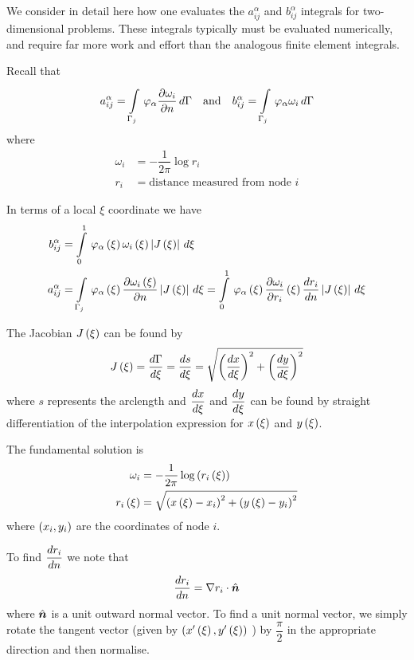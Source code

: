 We consider in detail here how one evaluates the $a_{ij}^{\alpha}$ and
$b_{ij}^{\alpha}$ integrals for two-dimensional problems.  These integrals
typically must be evaluated numerically, and require far more work and effort
than the analogous finite element integrals.

Recall that 
\begin{equation*}
  a_{ij}^{\alpha} =   \displaystyle\int\limits_{\Gamma_{j}}^{} \, \varphi_{\alpha} 
     \dfrac{\partial \omega_i}{\partial n} \,d\Gamma  \quad \text{and} \quad b_{ij}^{\alpha} = 
    \displaystyle\int\limits_{\Gamma_{j}}^{} \, \varphi_{\alpha}  \omega_{i}\,d\Gamma 
\end{equation*}
where 
\begin{align*}
  \omega_{i} &= - \dfrac{1}{2 \pi} \log r_{i}\\
  r_{i} &= \text{distance measured from node $i$}
\end{align*} 

In terms of a local $\xi$ coordinate we have
\begin{align}
  b_{ij}^{\alpha} &=   \displaystyle\int\limits_{0}^{1} \,   \varphi_{\alpha} \left( \xi \right)    \omega_{i}\left( \xi \right) 
    \left|  J\left( \xi \right)  \right|\,d\xi  \\
  a_{ij}^{\alpha} &=   \displaystyle\int\limits_{\Gamma_{j}}^{} \,   \varphi_{\alpha} \left( \xi \right)   
   \dfrac{\partial  \omega_{i}\left( \xi \right) }{\partial n}  \left|  J\left( \xi \right)  \right|\,d\xi  =   \displaystyle\int\limits_{0}^{1} \,   \varphi_{\alpha} \left( \xi \right)     \dfrac{\partial \omega_{i}}{\partial r_{i}} \left( \xi \right)    \dfrac{ d r_{i}}{d n} 
    \left|  J\left( \xi \right)  \right|\,d\xi 
\end{align}
  
The Jacobian $ J\left( \xi \right) $ can be found by
\begin{equation}
   J\left( \xi \right)  =  \dfrac{ d \Gamma}{d \xi}  =  \dfrac{ d s}{d \xi}  = 
  \sqrt{\left(  \dfrac{ d x}{d \xi}  \right)^{2} + \left(  \dfrac{ d y}{d \xi}  \right)^{2}}
  \label{eqn:Jacobian}
\end{equation}
where $s$ represents the arclength and $ \dfrac{ d x}{d \xi} $ and $ \dfrac{ d y}{d \xi} $ can be found by
straight differentiation of the interpolation expression for $ x\left( \xi \right) $ and
$ y\left( \xi \right) $.

The fundamental solution is
\begin{align*}
  \omega_{i} &= -\dfrac{1}{2 \pi} \log \left(  r_{i}\left( \xi \right)  \right) \\
   r_{i}\left( \xi \right)  &= \sqrt{\left(  x\left( \xi \right) -x_{i} \right)^{2}+
    \left(  y\left( \xi \right) -y_{i} \right)^{2}}    
\end{align*}
where $\left( x_{i},y_{i} \right)$ are the coordinates of node $i$.

To find $ \dfrac{ d r_{i}}{d n} $  we note that  
\begin{equation}
  \dby{r_{i}}{n} = \dotprod{\grad r_{i}}{\hat{\vect{n}}}
  \label{eqn:dridn}
\end{equation}
where $\hat{\vect{n}}$ is a unit outward normal vector.  To find a unit normal
vector, we simply rotate the tangent vector (given by
$\left(  x'\left( \xi \right) , y'\left( \xi \right)  \right)$ ) by $\dfrac{\pi}{2}$ in the
appropriate direction and then normalise.

